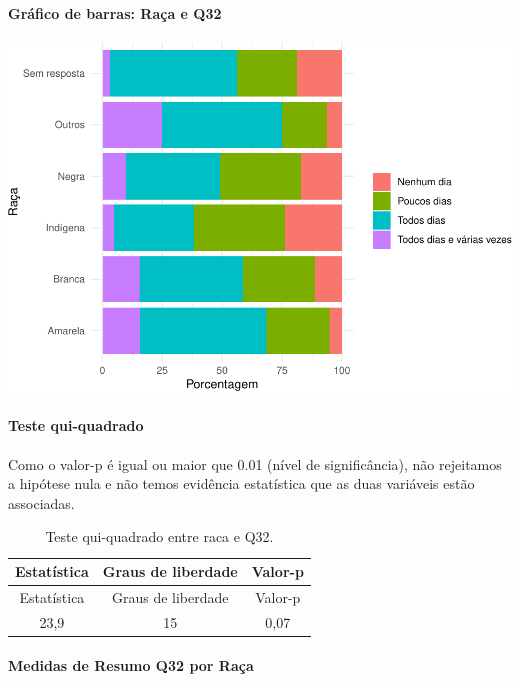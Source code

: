 \documentclass[]{article}
\let\oldparagraph\paragraph
\renewcommand{\paragraph}[1]{\oldparagraph{#1}\mbox{}}
\begin{document}
\hypertarget{gruxe1fico-de-barras-rauxe7a-e-q32}{%
\paragraph{Gráfico de barras: Raça e Q32}\label{gruxe1fico-de-barras-rauxe7a-e-q32}}

\begin{center}\includegraphics[width=0.75\linewidth]{relatorio_covid19_files/figure-latex/unnamed-chunk-1106-1} \end{center}

\hypertarget{teste-qui-quadrado-95}{%
\paragraph{Teste qui-quadrado}\label{teste-qui-quadrado-95}}

Como o valor-p é igual ou maior que 0.01 (nível de significância), não rejeitamos a hipótese nula e não temos evidência estatística que as duas variáveis estão associadas.

\begin{longtable}[]{@{}ccc@{}}
\caption{\label{tab:unnamed-chunk-1108}Teste qui-quadrado entre raca e Q32.}\tabularnewline
\toprule
Estatística & Graus de liberdade & Valor-p\tabularnewline
\midrule
\endfirsthead
\toprule
Estatística & Graus de liberdade & Valor-p\tabularnewline
\midrule
\endhead
23,9 & 15 & 0,07\tabularnewline
\bottomrule
\end{longtable}

\cleardoublepage

\hypertarget{medidas-de-resumo-q32-por-rauxe7a}{%
\paragraph{Medidas de Resumo Q32 por Raça}\label{medidas-de-resumo-q32-por-rauxe7a}}
\end{document}
